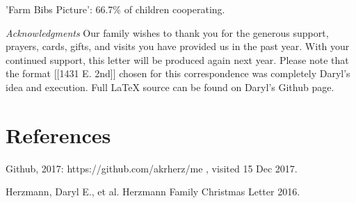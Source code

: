 \documentclass[letterpaper,11pt]{article}
\makeatletter
\def\refer{\par\noindent\hangindent\parindent\hangafter1}
\newenvironment{figurehere}
  {\def\@captype{figure}}
  {}
\makeatother
\begin{document}
\begin{multicols}{2}
\bigskip

\begin{figurehere}
 \centering   
 \caption{'Farm Bibs Picture': 66.7\% of children cooperating.}
\end{figurehere}

\bigskip
  \emph{Acknowledgments} Our family wishes to thank you for the generous 
support, prayers, cards, gifts, and visits you have provided us in the past
year. With your continued support, this letter will be produced again
next year. Please note that the format [[1431 E. 2nd]] chosen for this
correspondence was completely Daryl's idea and execution. Full \LaTeX\xspace source can be found on 
Daryl's Github page.

\section{References}

\refer Github, 2017: https://github.com/akrherz/me , visited 15 Dec 2017.
\refer Herzmann, Daryl E., et al. Herzmann Family Christmas Letter 2016. 

\end{multicols}
\end{document}
